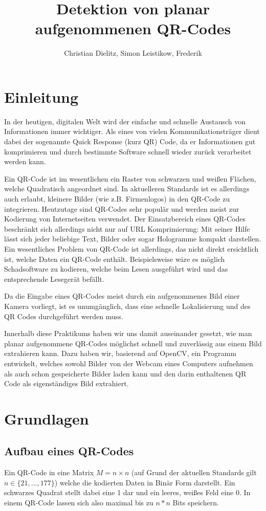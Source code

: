\documentclass[a4paper, oneside, 12pt]{article}
\title{Detektion von planar aufgenommenen QR-Codes}
\author{Christian Dielitz, Simon Leistikow, Frederik }
\begin{document}
	
\maketitle
\newpage

\tableofcontents
\newpage

\section{Einleitung}
\label{s:einleitung}
In der heutigen, digitalen Welt wird der einfache und schnelle Austausch von Informationen immer wichtiger. Als eines von vielen Kommunikationsträger dient dabei der sogenannte Quick Response (kurz QR) Code, da er Informationen gut komprimieren und durch bestimmte Software schnell wieder zurück verarbeitet werden kann.

Ein QR-Code ist im wesentlichen ein Raster von schwarzen und weißen Flächen, welche Quadratisch angeordnet sind. In aktuelleren Standards ist es allerdings auch erlaubt, kleinere Bilder (wie z.B. Firmenlogos) in den QR-Code zu integrieren. Heutzutage sind QR-Codes sehr populär und werden meist zur Kodierung von Internetseiten verwendet. Der Einsatzbereich eines QR-Codes beschränkt sich allerdings nicht nur auf URL Komprimierung: Mit seiner Hilfe lässt sich jeder beliebige Text, Bilder oder sogar Hologramme kompakt darstellen. Ein wesentliches Problem von QR-Code ist allerdings, das nicht direkt ersichtlich ist, welche Daten ein QR-Code enthält. Beispielsweise wäre es möglich Schadsoftware zu kodieren, welche beim Lesen ausgeführt wird und das entsprechende Lesegerät befällt.

Da die Eingabe eines QR-Codes meist durch ein aufgenommenes Bild einer Kamera vorliegt, ist es unumgänglich, dass eine schnelle Lokalisierung und des QR Codes durchgeführt werden muss.

Innerhalb diese Praktikums haben wir uns damit auseinander gesetzt, wie man planar aufgenommene QR-Codes möglichst schnell und zuverlässig aus einem Bild extrahieren kann. Dazu haben wir, basierend auf OpenCV, ein Programm entwickelt, welches sowohl Bilder von der Webcam eines Computers aufnehmen als auch schon gespeicherte Bilder laden kann und den  darin enthaltenen QR Code als eigenständiges Bild extrahiert.

\newpage
\section{Grundlagen}
\label{s:grundlagen}
\subsection{Aufbau eines QR-Codes}
\label{ss:aufbau}
Ein QR-Code in eine Matrix $M = n \times n$ (auf Grund der aktuellen Standards gilt $n \in \{21,...,177\}$) welche die kodierten Daten in Binär Form darstellt. Ein schwarzes Quadrat stellt dabei eine 1 dar und ein leeres, weißes Feld eine 0. In einem QR-Code lassen sich also maximal bis zu $n*n$ Bits speichern.
\end{document}

